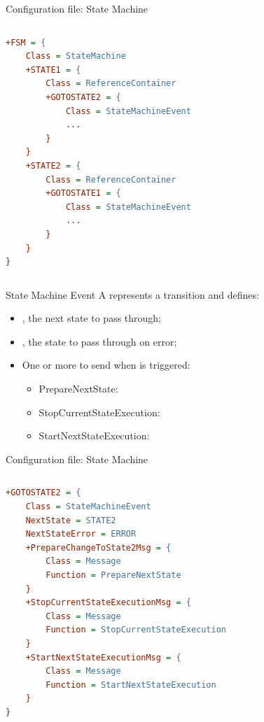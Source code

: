 \begin{frame}[fragile]{Configuration file: State Machine}
	\begin{columns}
		\begin{lstlisting}[style=normal, language=cfg]
+FSM = {
    Class = StateMachine
    +STATE1 = {
        Class = ReferenceContainer
        +GOTOSTATE2 = {
            Class = StateMachineEvent
            ...
        }
    }
    +STATE2 = {
        Class = ReferenceContainer
        +GOTOSTATE1 = {
            Class = StateMachineEvent
            ...
        }
    }
}\end{lstlisting}
	\end{columns}
\end{frame}

\begin{frame}{State Machine Event}
	A  represents a transition and defines:
	\begin{itemize}
		\item {}, the next state to pass through;
		\item {}, the state to pass through on error;
		\item One or more  to send when is triggered:
		      \begin{itemize}
			      \item PrepareNextState:
			      \item StopCurrentStateExecution:
			      \item StartNextStateExecution:
		      \end{itemize}
	\end{itemize}
\end{frame}

\begin{frame}[fragile]{Configuration file: State Machine}
	\begin{columns}
		\begin{lstlisting}[style=normal, language=cfg]
+GOTOSTATE2 = {
    Class = StateMachineEvent
    NextState = STATE2
    NextStateError = ERROR
    +PrepareChangeToState2Msg = {
        Class = Message
        Function = PrepareNextState
    }
    +StopCurrentStateExecutionMsg = {
        Class = Message
        Function = StopCurrentStateExecution
    }
    +StartNextStateExecutionMsg = {
        Class = Message
        Function = StartNextStateExecution
    }
}\end{lstlisting}
	\end{columns}
\end{frame}

